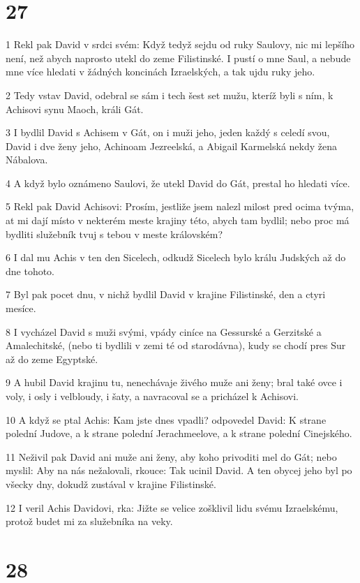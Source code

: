 \chapter{27}

\par 1 Rekl pak David v srdci svém: Když tedyž sejdu od ruky Saulovy, nic mi lepšího není, než abych naprosto utekl do zeme Filistinské. I pustí o mne Saul, a nebude mne více hledati v žádných koncinách Izraelských, a tak ujdu ruky jeho.
\par 2 Tedy vstav David, odebral se sám i tech šest set mužu, kteríž byli s ním, k Achisovi synu Maoch, králi Gát.
\par 3 I bydlil David s Achisem v Gát, on i muži jeho, jeden každý s celedí svou, David i dve ženy jeho, Achinoam Jezreelská, a Abigail Karmelská nekdy žena Nábalova.
\par 4 A když bylo oznámeno Saulovi, že utekl David do Gát, prestal ho hledati více.
\par 5 Rekl pak David Achisovi: Prosím, jestliže jsem nalezl milost pred ocima tvýma, at mi dají místo v nekterém meste krajiny této, abych tam bydlil; nebo proc má bydliti služebník tvuj s tebou v meste královském?
\par 6 I dal mu Achis v ten den Sicelech, odkudž Sicelech bylo králu Judských až do dne tohoto.
\par 7 Byl pak pocet dnu, v nichž bydlil David v krajine Filistinské, den a ctyri mesíce.
\par 8 I vycházel David s muži svými, vpády ciníce na Gessurské a Gerzitské a Amalechitské, (nebo ti bydlili v zemi té od starodávna), kudy se chodí pres Sur až do zeme Egyptské.
\par 9 A hubil David krajinu tu, nenechávaje živého muže ani ženy; bral také ovce i voly, i osly i velbloudy, i šaty, a navracoval se a pricházel k Achisovi.
\par 10 A když se ptal Achis: Kam jste dnes vpadli? odpovedel David: K strane polední Judove, a k strane polední Jerachmeelove, a k strane polední Cinejského.
\par 11 Neživil pak David ani muže ani ženy, aby koho privoditi mel do Gát; nebo myslil: Aby na nás nežalovali, rkouce: Tak ucinil David. A ten obycej jeho byl po všecky dny, dokudž zustával v krajine Filistinské.
\par 12 I veril Achis Davidovi, rka: Jižte se velice zošklivil lidu svému Izraelskému, protož budet mi za služebníka na veky.

\chapter{28}

